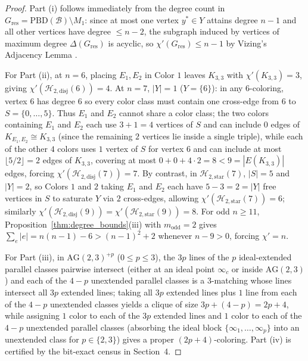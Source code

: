 \documentclass[11pt,reqno]{amsart}
\theoremstyle{definition}
\theoremstyle{remark}
\begin{document}
\begin{proof}
Part (i) follows immediately from the degree count in $G_{\mathrm{res}} = \mathrm{PBD}(\mathcal{B}) \setminus M_1$: since at most one vertex $y^* \in Y$ attains degree $n - 1$ and all other vertices have degree $\le n - 2$, the subgraph induced by vertices of maximum degree $\Delta(G_{\mathrm{res}})$ is acyclic, so $\chi'(G_{\mathrm{res}}) \le n - 1$ by Vizing's Adjacency Lemma \cite{Vizing1964}.

For Part (ii), at $n = 6$, placing $E_1, E_2$ in Color $1$ leaves $K_{3,3}$ with $\chi'(K_{3,3}) = 3$, giving $\chi'(\mathcal{H}_{2,\mathrm{disj}}(6)) = 4$. At $n = 7$, $|Y| = 1$ ($Y = \{6\}$): in any $6$-coloring, vertex $6$ has degree $6$ so every color class must contain one cross-edge from $6$ to $S = \{0,\dots,5\}$. Thus $E_1$ and $E_2$ cannot share a color class; the two colors containing $E_1$ and $E_2$ each use $3 + 1 = 4$ vertices of $S$ and can include $0$ edges of $K_{E_1, E_2} \cong K_{3,3}$ (since the remaining $2$ vertices lie inside a single triple), while each of the other $4$ colors uses $1$ vertex of $S$ for vertex $6$ and can include at most $\lfloor 5/2 \rfloor = 2$ edges of $K_{3,3}$, covering at most $0 + 0 + 4 \cdot 2 = 8 < 9 = |E(K_{3,3})|$ edges, forcing $\chi'(\mathcal{H}_{2,\mathrm{disj}}(7)) = 7$. By contrast, in $\mathcal{H}_{2,\mathrm{star}}(7)$, $|S| = 5$ and $|Y| = 2$, so Colors $1$ and $2$ taking $E_1$ and $E_2$ each have $5 - 3 = 2 = |Y|$ free vertices in $S$ to saturate $Y$ via $2$ cross-edges, allowing $\chi'(\mathcal{H}_{2,\mathrm{star}}(7)) = 6$; similarly $\chi'(\mathcal{H}_{2,\mathrm{disj}}(9)) = \chi'(\mathcal{H}_{2,\mathrm{star}}(9)) = 8$. For odd $n \ge 11$, Proposition~\ref{thm:degree_bounds}(iii) with $m_{\mathrm{odd}} = 2$ gives $\sum_{e} |e| = n(n-1) - 6 > (n-1)^2 + 2$ whenever $n - 9 > 0$, forcing $\chi' = n$.

For Part (iii), in $\mathrm{AG}(2,3)^{+p}$ ($0 \le p \le 3$), the $3p$ lines of the $p$ ideal-extended parallel classes pairwise intersect (either at an ideal point $\infty_c$ or inside $\mathrm{AG}(2,3)$) and each of the $4 - p$ unextended parallel classes is a $3$-matching whose lines intersect all $3p$ extended lines; taking all $3p$ extended lines plus $1$ line from each of the $4 - p$ unextended classes yields a clique of size $3p + (4 - p) = 2p + 4$, while assigning $1$ color to each of the $3p$ extended lines and $1$ color to each of the $4 - p$ unextended parallel classes (absorbing the ideal block $\{\infty_1, \dots, \infty_p\}$ into an unextended class for $p \in \{2, 3\}$) gives a proper $(2p + 4)$-coloring. Part (iv) is certified by the bit-exact census in Section~4.
\end{proof}
\end{document}
